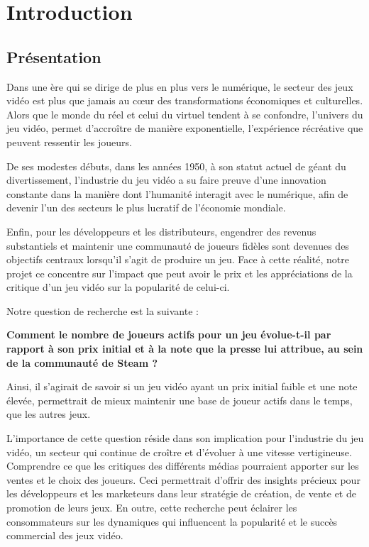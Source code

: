\documentclass[mstat,12pt]{unswthesis}
\begin{document}



\hypertarget{introduction}{%
\chapter{Introduction}\label{introduction}}

\hypertarget{pruxe9sentation}{%
\section{Présentation}\label{pruxe9sentation}}

Dans une ère qui se dirige de plus en plus vers le numérique, le secteur
des jeux vidéo est plus que jamais au cœur des transformations
économiques et culturelles. Alors que le monde du réel et celui du
virtuel tendent à se confondre, l'univers du jeu vidéo, permet
d'accroître de manière exponentielle, l'expérience récréative que
peuvent ressentir les joueurs.

De ses modestes débuts, dans les années 1950, à son statut actuel de
géant du divertissement, l'industrie du jeu vidéo a su faire preuve
d'une innovation constante dans la manière dont l'humanité interagit
avec le numérique, afin de devenir l'un des secteurs le plus lucratif de
l'économie mondiale.

Enfin, pour les développeurs et les distributeurs, engendrer des revenus
substantiels et maintenir une communauté de joueurs fidèles sont
devenues des objectifs centraux lorsqu'il s'agit de produire un jeu.
Face à cette réalité, notre projet ce concentre sur l'impact que peut
avoir le prix et les appréciations de la critique d'un jeu vidéo sur la
popularité de celui-ci.

Notre question de recherche est la suivante :

\bigskip

\centering

\textbf{Comment le nombre de joueurs actifs pour un jeu évolue-t-il par
rapport à son prix initial et à la note que la presse lui attribue, au
sein de la communauté de Steam ?}

\bigskip
\justifying

Ainsi, il s'agirait de savoir si un jeu vidéo ayant un prix initial
faible et une note élevée, permettrait de mieux maintenir une base de
joueur actifs dans le temps, que les autres jeux.

L'importance de cette question réside dans son implication pour
l'industrie du jeu vidéo, un secteur qui continue de croître et
d'évoluer à une vitesse vertigineuse. Comprendre ce que les critiques
des différents médias pourraient apporter sur les ventes et le choix des
joueurs. Ceci permettrait d'offrir des insights précieux pour les
développeurs et les marketeurs dans leur stratégie de création, de vente
et de promotion de leurs jeux. En outre, cette recherche peut éclairer
les consommateurs sur les dynamiques qui influencent la popularité et le
succès commercial des jeux vidéo. \newpage
\end{document}
